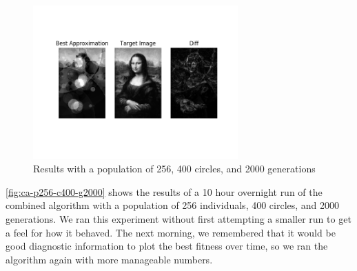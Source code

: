 \documentclass{article}
\begin{document}
\begin{figure}[H]
    \centering
    \includegraphics[width=0.7\textwidth]{output/ca-p256c400g2000.png}
    \caption{Results with a population of 256, 400 circles, and 2000 generations}\label{fig:ca-p256-c400-g2000}
\end{figure}

\autoref{fig:ca-p256-c400-g2000} shows the results of a 10 hour overnight run of the combined algorithm with a population of 256 individuals, 400 circles, and 2000 generations. We ran this experiment without first attempting a smaller run to get a feel for how it behaved. The next morning, we remembered that it would be good diagnostic information to plot the best fitness over time, so we ran the algorithm again with more manageable numbers.
\end{document}
